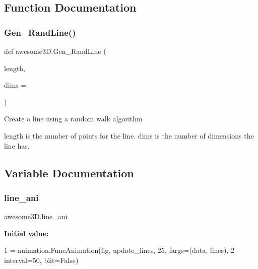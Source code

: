 \subsection{Function Documentation}
\mbox{\label{namespaceawesome3_d_a8dbde731a58e2a410a00a8b710f675dd}} 
\subsubsection{\texorpdfstring{Gen\+\_\+\+Rand\+Line()}{Gen\_RandLine()}}
{\footnotesize\ttfamily def awesome3\+D.\+Gen\+\_\+\+Rand\+Line (\begin{DoxyParamCaption}\item[{}]{length,  }\item[{}]{dims = {} }\end{DoxyParamCaption})}

\begin{DoxyVerb}Create a line using a random walk algorithm

length is the number of points for the line.
dims is the number of dimensions the line has.
\end{DoxyVerb}
 

\subsection{Variable Documentation}
\mbox{\label{namespaceawesome3_d_af81b21dee31a4d9e3517281959dc0f13}} 
\subsubsection{\texorpdfstring{line\+\_\+ani}{line\_ani}}
{\footnotesize\ttfamily awesome3\+D.\+line\+\_\+ani}

{\bfseries Initial value\+:}
\begin{DoxyCode}
1 =  animation.FuncAnimation(fig, update\_lines, 25, fargs=(data, lines),
2                                    interval=50, blit=\textcolor{keyword}{False})
\end{DoxyCode}
